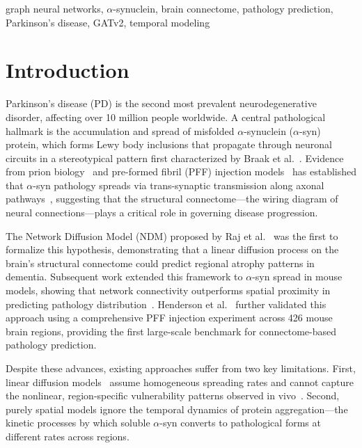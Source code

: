 \documentclass[conference]{IEEEtran}
\begin{document}
\begin{IEEEkeywords}
graph neural networks, $\alpha$-synuclein, brain connectome, pathology prediction, Parkinson's disease, GATv2, temporal modeling
\end{IEEEkeywords}

\section{Introduction}

Parkinson's disease (PD) is the second most prevalent neurodegenerative disorder, affecting over 10 million people worldwide. A central pathological hallmark is the accumulation and spread of misfolded $\alpha$-synuclein ($\alpha$-syn) protein, which forms Lewy body inclusions that propagate through neuronal circuits in a stereotypical pattern first characterized by Braak et al.~\cite{braak2003staging}. Evidence from prion biology~\cite{jucker2013self} and pre-formed fibril (PFF) injection models~\cite{luk2012pathological} has established that $\alpha$-syn pathology spreads via trans-synaptic transmission along axonal pathways~\cite{bieri2018internalization}, suggesting that the structural connectome—the wiring diagram of neural connections—plays a critical role in governing disease progression.

The Network Diffusion Model (NDM) proposed by Raj et al.~\cite{raj2012network} was the first to formalize this hypothesis, demonstrating that a linear diffusion process on the brain's structural connectome could predict regional atrophy patterns in dementia. Subsequent work extended this framework to $\alpha$-syn spread in mouse models, showing that network connectivity outperforms spatial proximity in predicting pathology distribution~\cite{mezias2020neural}. Henderson et al.~\cite{henderson2019spread} further validated this approach using a comprehensive PFF injection experiment across 426 mouse brain regions, providing the first large-scale benchmark for connectome-based pathology prediction.

Despite these advances, existing approaches suffer from two key limitations. First, linear diffusion models~\cite{raj2018models} assume homogeneous spreading rates and cannot capture the nonlinear, region-specific vulnerability patterns observed in vivo~\cite{cornblath2020defining}. Second, purely spatial models ignore the temporal dynamics of protein aggregation—the kinetic processes by which soluble $\alpha$-syn converts to pathological forms at different rates across regions.
\end{document}
